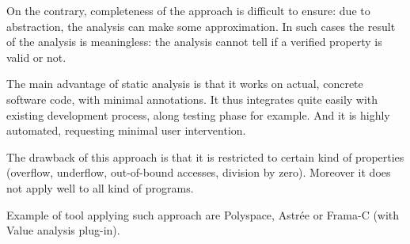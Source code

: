 On the contrary, completeness of the approach is difficult to ensure:
due to abstraction, the analysis can make some approximation. In such
cases the result of the analysis is meaningless: the analysis cannot
tell if a verified property is valid or not.

The main advantage of static analysis is that it works on actual,
concrete software code, with minimal annotations. It thus integrates
quite easily with existing development process, along testing phase
for example. And it is highly automated, requesting minimal user
intervention.

The drawback of this approach is that it is restricted to certain kind
of properties (overflow, underflow, out-of-bound accesses, division by
zero). Moreover it does not apply well to all kind of programs.


Example of tool applying such approach are Polyspace, Astrée or
Frama-C (with Value analysis plug-in).



















